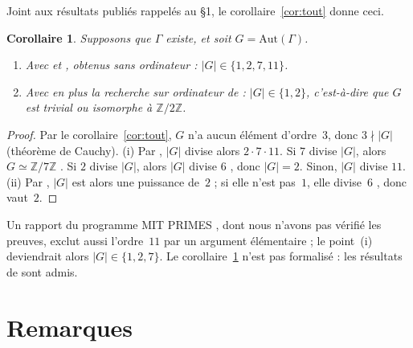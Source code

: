 \documentclass[11pt,a4paper]{article}
\newtheorem{corollary}[theorem]{Corollaire}
\theoremstyle{remark}
\newcommand{\Z}{\mathbb{Z}}
\begin{document}
Joint aux résultats publiés rappelés au §1, le corollaire~\ref{cor:tout} donne ceci.

\begin{corollary}\label{cor:aut}
Supposons que $\Gamma$ existe, et soit $G=\mathrm{Aut}(\Gamma)$.
\begin{enumerate}[label=(\roman*),nosep]
\item Avec \cite{MM04} et \cite{CW25}, obtenus sans ordinateur : $|G|\in\{1,2,7,11\}$.
\item Avec en plus la recherche sur ordinateur de \cite{B09,BL11} : $|G|\in\{1,2\}$, c'est-à-dire que $G$ est trivial ou
isomorphe à $\Z/2\Z$.
\end{enumerate}
\end{corollary}
\begin{proof}
Par le corollaire~\ref{cor:tout}, $G$ n'a aucun élément d'ordre~3, donc $3\nmid|G|$ (théorème de Cauchy).
(i) Par \cite{MM04}, $|G|$ divise alors $2\cdot7\cdot11$. Si $7$ divise $|G|$, alors $G\simeq\Z/7\Z$ \cite{CW25}. Si $2$ divise
$|G|$, alors $|G|$ divise $6$ \cite{CW25}, donc $|G|=2$. Sinon, $|G|$ divise $11$.
(ii) Par \cite{BL11}, $|G|$ est alors une puissance de~$2$ ; si elle n'est pas~$1$, elle divise~$6$ \cite{CW25}, donc vaut~$2$.
\end{proof}

Un rapport du programme MIT PRIMES \cite{LM14}, dont nous n'avons pas vérifié les preuves, exclut aussi l'ordre~$11$ par un
argument élémentaire ; le point~(i) deviendrait alors $|G|\in\{1,2,7\}$. Le corollaire~\ref{cor:aut} n'est pas formalisé :
les résultats de \cite{MM04,B09,BL11,CW25} sont admis.

\section{Remarques}
\end{document}
